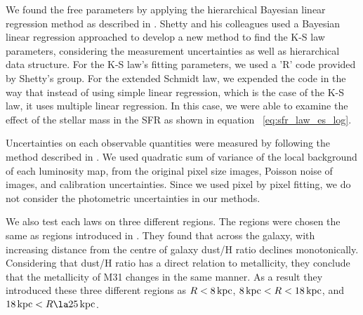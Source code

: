 \documentclass[useAMS,usenatbib]{mn2e}
\newcommand \kpc        {\,{\rm kpc}}
\begin{document}
We found the free parameters by applying the hierarchical Bayesian linear regression method as described in \cite{Shetty13}. Shetty and his colleagues used a Bayesian linear regression approached to develop a new method to find the K-S law parameters, considering the measurement uncertainties as well as hierarchical data structure. For the K-S law's fitting parameters, we used a 'R' code provided by Shetty's group. For the extended Schmidt law, we expended the code in the way that instead of using simple linear regression, which is the case of the K-S law, it uses multiple linear regression. In this case, we were able to examine the effect of the stellar mass in the SFR as shown in equation ~\ref{eq:sfr_law_es_log}. 

Uncertainties on each observable quantities were measured by following the method described in \cite{Kennicutt07}. We used quadratic sum of variance of the local background of each luminosity map, from the original pixel size images, Poisson noise of images, and calibration uncertainties. Since we used pixel by pixel fitting, we do not consider the photometric uncertainties in our methods.

We also test each laws on three different regions. The regions were chosen the same as regions introduced in \cite{Draine14}. They found that across the galaxy, with increasing distance from the centre of galaxy dust/H ratio declines monotonically. Considering that dust/H ratio has a direct relation to metallicity, they conclude that the metallicity of M31 changes in the same manner. As a result they introduced these three different regions as $R< 8\kpc$, $8\kpc < R < 18\kpc$, and $18\kpc < R \la 25\kpc$. 
\end{document}
